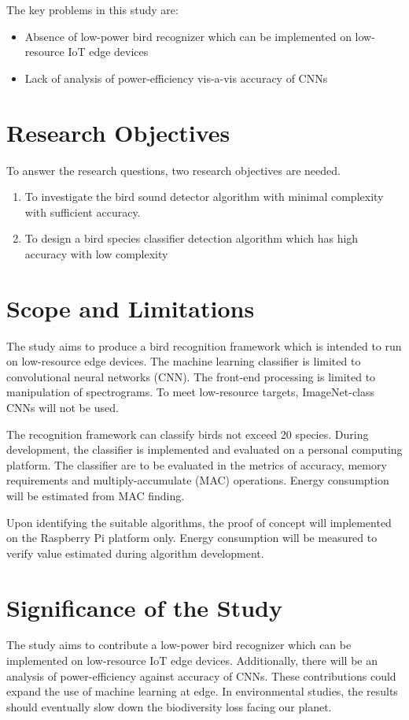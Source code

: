 The key problems in this study are:

\begin{itemize}
    \item Absence of low-power bird recognizer which can be implemented on low-resource IoT edge devices
    \item Lack of analysis of power-efficiency vis-a-vis accuracy of CNNs
\end{itemize}

\section{Research Objectives}

To answer the research questions, two research objectives are needed.

\begin{enumerate}
    \item To investigate the bird sound detector algorithm with minimal complexity with sufficient accuracy.
    \item To design a bird species classifier detection algorithm which has high accuracy with low complexity
\end{enumerate}

\section{Scope and Limitations}

The study aims to produce a bird recognition framework which is intended to run on low-resource edge devices. The machine learning classifier is limited to convolutional neural networks (CNN). The front-end processing is limited to manipulation of spectrograms. To meet low-resource targets,  ImageNet-class CNNs will not be used.

The recognition framework can classify birds not exceed 20 species.
During development, the classifier is implemented and evaluated on a personal computing platform. The classifier are to be evaluated in the metrics of accuracy, memory requirements and multiply-accumulate (MAC) operations. Energy consumption will be estimated from MAC finding.

Upon identifying the suitable algorithms, the proof of concept will implemented on the Raspberry Pi platform only. Energy consumption will be measured to verify value estimated during algorithm development.

\section{Significance of the Study}

The study aims to contribute a low-power bird recognizer which can be implemented on low-resource IoT edge devices. 
Additionally, there will be an analysis of power-efficiency against accuracy of CNNs. These contributions could expand the use of machine learning at edge. In environmental studies, the results should eventually slow down the biodiversity loss facing our planet.
